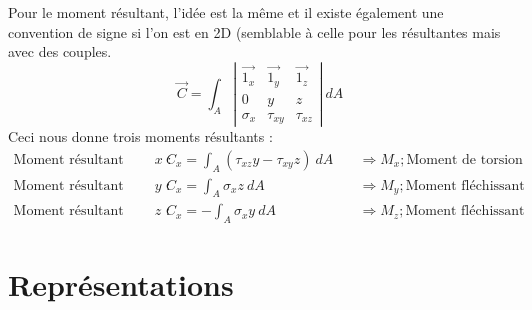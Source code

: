 	Pour le moment résultant, l'idée est la même et il existe également une 
	convention de signe si l'on est en 2D (semblable à celle pour les 
	résultantes mais avec des couples.
	\begin{equation}
	\displaystyle \vec{C} = \int_A\left|\begin{array}{ccc}
	\vec{1_x} & \vec{1_y} & \vec{1_z}\\
	0 & y & z\\
	\sigma_x & \tau_{xy} & \tau_{xz}
	\end{array}\right|\ dA
	\end{equation}
	Ceci nous donne trois moments résultants : 
	\begin{equation}
	\begin{array}{lll}
	\text{Moment résultant selon $x$ : } & \displaystyle C_x = \int_A (
	\tau_{xz}y-\tau_{xy}z)\ dA&\quad\Rightarrow M_x;  \text{Moment de 
	torsion}\\
	\text{Moment résultant selon $y$ : } & \displaystyle C_x = \int_A
	\sigma_xz\ dA&\quad\Rightarrow M_y;  \text{Moment fléchissant}	\\
	\text{Moment résultant selon $z$ : } & \displaystyle C_x = -\int_A
	\sigma_xy\ dA&\quad\Rightarrow M_z;  \text{Moment fléchissant}		
	\end{array}
	\end{equation}
\vspace{-1cm}
\section{Représentations}
